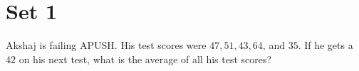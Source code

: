 \documentclass[11pt, a5paper]{article}
\begin{document}
\section*{Set 1}

\begin{problem}%
Akshaj is failing APUSH. His test scores were $47, 51, 43, 64$, and $35$. If he gets a $42$ on his next test, what is the average of all his test scores?
\end{problem}
\end{document}
